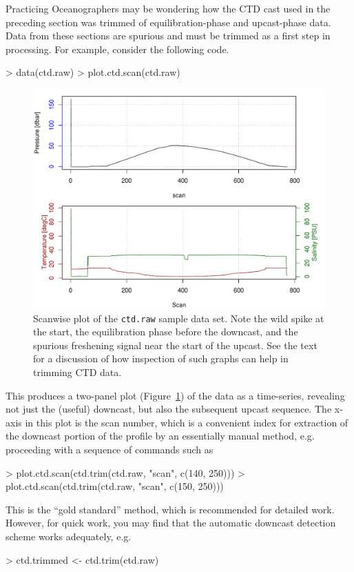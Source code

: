 \documentclass{article}
\begin{document}
Practicing Oceanographers may be wondering how the CTD cast used in the preceding section was
trimmed of equilibration-phase and upcast-phase data. Data from these sections are spurious and
must be trimmed as a first step in processing. For example, consider the following code.
\begin{Schunk}
\begin{Sinput}
> data(ctd.raw)
> plot.ctd.scan(ctd.raw)
\end{Sinput}
\end{Schunk}
\begin{figure}
\begin{center}
\includegraphics{oce-ctdrawfig}
\end{center}
\caption{Scanwise plot of the \texttt{ctd.raw} sample data set.  Note the wild spike at the start, the equilibration phase before the downcast, and the spurious freshening signal near the start of the upcast.  See the text for a discussion of how inspection of such graphs can help in trimming CTD data.}
\label{fig:ctdraw}
\end{figure}

\noindent This produces a two-panel plot (Figure~\ref{fig:ctdraw}) of the data as a
time-series, revealing not just the (useful) downcast, but also the subsequent upcast sequence.
The x-axis in this plot is the scan number, which is a convenient index for extraction of the
downcast portion of the profile by an essentially manual method, e.g. proceeding with a
sequence of commands such as
\begin{Schunk}
\begin{Sinput}
> plot.ctd.scan(ctd.trim(ctd.raw, "scan", c(140, 250)))
> plot.ctd.scan(ctd.trim(ctd.raw, "scan", c(150, 250)))
\end{Sinput}
\end{Schunk}
This is the ``gold standard'' method, which is recommended for detailed work. However, for
quick work, you may find that the automatic downcast detection scheme works adequately, e.g.
\begin{Schunk}
\begin{Sinput}
> ctd.trimmed <- ctd.trim(ctd.raw)
\end{Sinput}
\end{Schunk}
\end{document}
